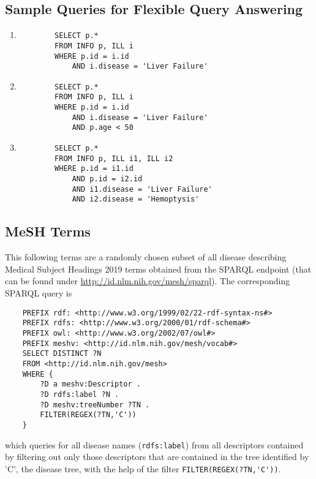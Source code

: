 \subsection{Sample Queries for Flexible Query Answering}
\label{app:flexqueries}

\begin{enumerate}

    \item \begin{verbatim}
        SELECT p.* 
        FROM INFO p, ILL i 
        WHERE p.id = i.id 
            AND i.disease = 'Liver Failure'
    \end{verbatim}
    
    \item \begin{verbatim}
        SELECT p.* 
        FROM INFO p, ILL i 
        WHERE p.id = i.id 
            AND i.disease = 'Liver Failure'
            AND p.age < 50
    \end{verbatim}
        
    \item \begin{verbatim}
        SELECT p.* 
        FROM INFO p, ILL i1, ILL i2
        WHERE p.id = i1.id 
            AND p.id = i2.id 
            AND i1.disease = 'Liver Failure' 
            AND i2.disease = 'Hemoptysis'
    \end{verbatim}

\end{enumerate}



\subsection{MeSH Terms}
\label{app:terms}

This following terms are a randomly chosen subset of all disease describing Medical Subject Headings 2019 terms obtained from the SPARQL endpoint 
(that can be found under \url{http://id.nlm.nih.gov/mesh/sparql}). The corresponding SPARQL query is
\begin{verbatim}
    PREFIX rdf: <http://www.w3.org/1999/02/22-rdf-syntax-ns#>
    PREFIX rdfs: <http://www.w3.org/2000/01/rdf-schema#>
    PREFIX owl: <http://www.w3.org/2002/07/owl#>
    PREFIX meshv: <http://id.nlm.nih.gov/mesh/vocab#>
    SELECT DISTINCT ?N
    FROM <http://id.nlm.nih.gov/mesh>
    WHERE { 
        ?D a meshv:Descriptor .
        ?D rdfs:label ?N .
        ?D meshv:treeNumber ?TN .
        FILTER(REGEX(?TN,'C'))
    }
\end{verbatim}
which queries for all disease names (\verb!rdfs:label!) from all descriptors contained by filtering out only those descriptors that are contained in the
tree identified by 'C', the disease tree, with the help of the filter \verb!FILTER(REGEX(?TN,'C'))!.

